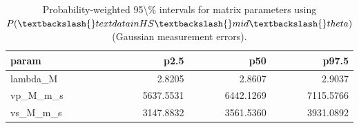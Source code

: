 \begin{table}[ht!]
\centering
\caption{Probability-weighted 95\textbackslash{}\% intervals for matrix parameters using $P(\textbackslash{}text{data in HS}\textbackslash{}mid\textbackslash{}theta)$ (Gaussian measurement errors).}
\label{tab:hs\_prob\_weighted\_95ci}
\begin{tabular}{lrrr}
\toprule
\textbf{param} & \textbf{p2.5} & \textbf{p50} & \textbf{p97.5} \\
\midrule
lambda\_M & 2.8205 & 2.8607 & 2.9037 \\
vp\_M\_m\_s & 5637.5531 & 6442.1269 & 7115.5766 \\
vs\_M\_m\_s & 3147.8832 & 3561.5360 & 3931.0892 \\
\bottomrule
\end{tabular}
\end{table}

